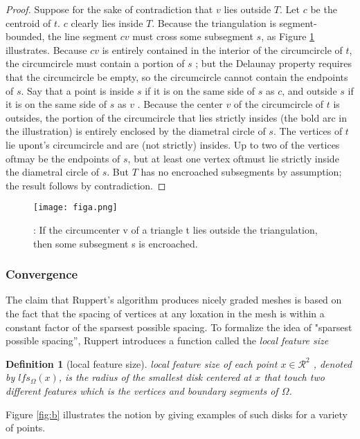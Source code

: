 \documentclass[letterpaper,12pt]{article}
\newtheorem{definition}[lemma]{Definition}
\begin{document}
\begin{proof}

 Suppose for the sake of contradiction that $v$ lies outside $T$. Let $c$ be the
centroid of $t$.  $c$ clearly lies inside $T$. Because the triangulation is segment-bounded, the
line segment $cv$ must cross some subsegment $s$, as Figure \ref{fig:thm1} illustrates. Because $cv$
is entirely contained in the interior of the circumcircle of $t$, the circumcircle must contain a
portion of $s$ ; but the Delaunay property requires that the circumcircle be empty, so the
circumcircle cannot contain the endpoints of $s$. Say that a point is inside $s$ if it is on the
same side of $s$ as $c$, and outside $s$ if it is on the same side of $s$ as $v$ . Because the
center $v$ of the circumcircle of $t$ is outsides, the portion of the circumcircle that lies
strictly insides (the bold arc in the illustration) is entirely enclosed by the diametral circle of
$s$. The vertices of $t$ lie upont’s circumcircle and are (not strictly) insides. Up to two of the
vertices oftmay be the endpoints of $s$, but at least one vertex oftmust lie strictly inside the
diametral circle of $s$. But $T$ has no encroached subsegments by assumption; the result follows by
contradiction.
\end{proof}

\begin{figure}[!htb] \centering
  \texttt{[image: figa.png]}
  \caption{: If
 the circumcenter v of a triangle t lies outside the triangulation, then some
subsegment s is encroached.}
  \label{fig:thm1}
\end{figure}

\subsubsection{Convergence}
\label{sec:01:03:02}

The claim that Ruppert's algorithm produces nicely graded meshes is based on the fact that the
spacing of vertices at any loxation in the mesh is within a constant factor of the sparsest possible
spacing. To formalize the idea of "sparsest possible spacing'', Ruppert introduces  a function
called the \emph{local feature size} 

\begin{definition}[local feature size]
  
  local feature size of each point $x \in \mathcal{R}^2 $ , denoted by $lfs_{\Omega}(x)$, is the
  radius of the smallest disk centered at $x$ that touch two different features which is the
  vertices and boundary segments of $\Omega$.
\end{definition}
 Figure \ref{fig:b} illustrates the notion by giving  examples of such disks for a variety of points. 
\end{document}

